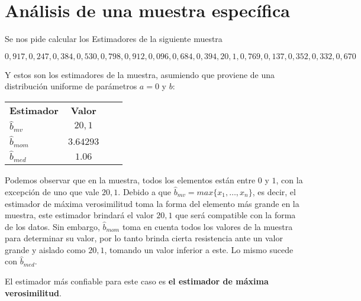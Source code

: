 \section{Análisis de una muestra específica}
Se nos pide calcular los Estimadores de la siguiente muestra

\begin{center}
$0,917, 0,247, 0,384, 0,530, 0,798, 0,912, 0,096, 0,684, 0,394, 20,1, 0,769, 0,137, 0,352, 0,332, 0,670$
\end{center}

Y estos son los estimadores de la muestra, asumiendo que proviene de una distribución uniforme de parámetros $a = 0$ y $b$:

\begin{table}[h]
	\centering
	\begin{tabular}{lccc}
		\textbf{Estimador} 	& \textbf{Valor} 	\\
		$\hat{b}_{mv}$  	& $20,1$ 			\\
		$\hat{b}_{mom}$		& $3.64293$ 		\\
		$\hat{b}_{med}$		& $1.06$
	\end{tabular}
\end{table}

Podemos observar que en la muestra, todos los elementos están entre $0$ y $1$, con la excepción de uno que vale $20,1$. Debido a que $\hat{b}_{mv} = max\{x_1, \dots, x_n\}$, es decir, el estimador de máxima verosimilitud toma la forma del elemento más grande en la muestra, este estimador brindará el valor $20,1$ que será compatible con la forma de los datos. Sin embargo, $\hat{b}_{mom}$ toma en cuenta todos los valores de la muestra para determinar su valor, por lo tanto brinda cierta resistencia ante un valor grande y aislado como $20,1$, tomando un valor inferior a este. Lo mismo sucede con $\hat{b}_{med}$.

\vskip 8pt

El estimador más confiable para este caso es \textbf{el estimador de máxima verosimilitud}.